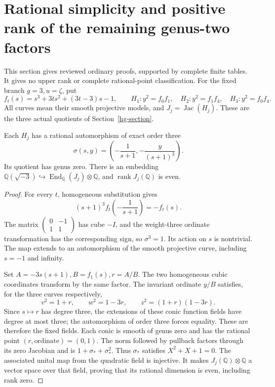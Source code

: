 \section{Rational simplicity and positive rank of the remaining genus-two factors}
\label{qs-section}

This section gives reviewed ordinary proofs, supported by complete finite
tables. It gives no upper rank or complete rational-point classification.
For the fixed branch \(g=3,u=\zeta\), put
\[
 f_t(s)=s^3+3ts^2+(3t-3)s-1,
 \qquad
 H_1:y^2=f_0f_1,\quad H_2:y^2=f_1f_4,\quad H_3:y^2=f_0f_4.
\]
All curves mean their smooth projective models, and
\(J_j=\operatorname{Jac}(H_j)\). These are the three actual quotients
of Section~\ref{hg-section}.

\begin{theorem}\label{qs-symmetry}
Each \(H_j\) has a rational automorphism of exact order three
\[
 \sigma(s,y)=\left(-\frac1{s+1},-\frac{y}{(s+1)^3}\right).
\]
Its quotient has genus zero. There is an embedding
\(\mathbb Q(\sqrt{-3})\hookrightarrow
\operatorname{End}_{\mathbb Q}(J_j)\otimes\mathbb Q\), and
\(\operatorname{rank}J_j(\mathbb Q)\) is even.
\end{theorem}
\begin{proof}
For every \(t\), homogeneous substitution gives
\[
 (s+1)^3 f_t\!\left(-\frac1{s+1}\right)=-f_t(s).
\]
The matrix \(\left(\begin{smallmatrix}0&-1\\1&1\end{smallmatrix}\right)\)
has cube \(-I\), and the weight-three ordinate transformation has the
corresponding sign, so \(\sigma^3=1\). Its action on \(s\) is nontrivial.
The map extends to an automorphism of the smooth projective curve,
including \(s=-1\) and infinity.

Set \(A=-3s(s+1), B=f_1(s), r=A/B\). The two homogeneous cubic
coordinates transform by the same factor. The invariant ordinate
\(y/B\) satisfies, for the three curves respectively,
\[
 v^2=1+r,\qquad w^2=1-3r,\qquad z^2=(1+r)(1-3r).
\]
Since \(s\mapsto r\) has degree three, the extensions of these conic
function fields have degree at most three; the automorphism of order
three forces equality. These are therefore the fixed fields. Each conic
is smooth of genus zero and has the rational point \((r,\text{ordinate})=(0,1)\).
The norm followed by pullback factors through its zero Jacobian and is
\(1+\sigma_*+\sigma_*^2\). Thus \(\sigma_*\) satisfies \(X^2+X+1=0\).
The associated unital map from the quadratic field is injective.
It makes \(J_j(\mathbb Q)\otimes\mathbb Q\) a vector space over that
field, proving that its rational dimension is even, including rank zero.
\end{proof}

